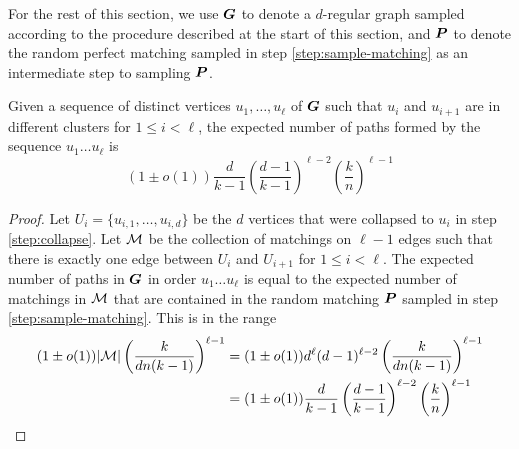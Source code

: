 For the rest of this section, we use $\boldsymbol{G}$ to denote a $d$-regular graph sampled according to the procedure described at the start of this section, and $\boldsymbol{P}$ to denote the random perfect matching sampled in step \ref{step:sample-matching} as an intermediate step to sampling $\boldsymbol{P}$.
\begin{proposition}	\label{prop:single-seq}
	Given a sequence of distinct vertices $u_1, \dots, u_\ell$ of $\boldsymbol{G}$ such that $u_i$ and $u_{i+1}$ are in different clusters for $1\le i<\ell$, the expected number of paths formed by the sequence $u_1 \dots u_\ell$ is
	\[
		(1\pm o(1)) \frac{d}{k-1}\left(\frac{d-1}{k-1}\right)^{\ell-2}\left(\frac{k}{n}\right)^{\ell-1}
	\]
\end{proposition}
\begin{proof}
	Let $U_i = \{u_{i,1}, \dots, u_{i,d}\}$ be the $d$ vertices that were collapsed to $u_i$ in step \ref{step:collapse}.  Let $\mathcal{M}$ be the collection of matchings on $\ell-1$ edges such that there is exactly one edge between $U_i$ and $U_{i+1}$ for $1 \le i < \ell$.  The expected number of paths in $\boldsymbol{G}$ in order $u_1 \dots u_\ell$ is equal to the expected number of matchings in $\mathcal{M}$ that are contained in the random matching $\boldsymbol{P}$ sampled in step \ref{step:sample-matching}.  This is in the range
	\begin{align*}
		(1\pm o(1))|\mathcal{M}|\left(\frac{k}{dn(k-1)}\right)^{\ell-1} &= (1\pm o(1))d^{\ell}(d-1)^{\ell-2}\left(\frac{k}{dn(k-1)}\right)^{\ell-1}\\
		&= (1\pm o(1)) \frac{d}{k-1}\left(\frac{d-1}{k-1}\right)^{\ell-2}\left(\frac{k}{n}\right)^{\ell-1}
	\end{align*}
\end{proof}


